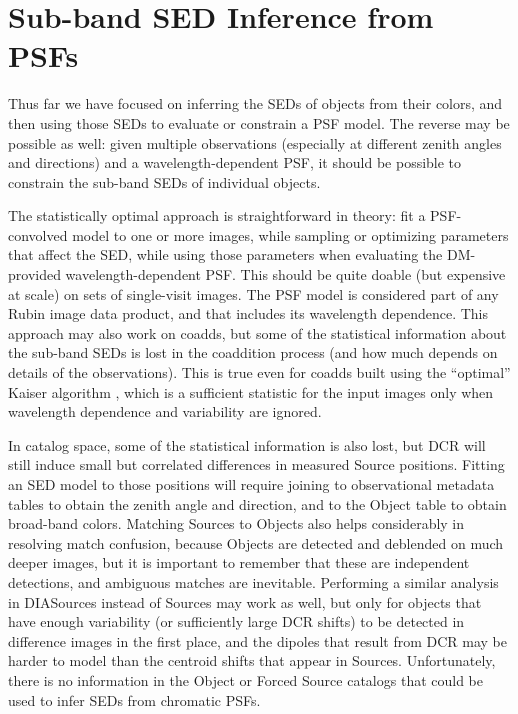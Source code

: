 \documentclass[DM,authoryear,toc]{lsstdoc}
\begin{document}
\section{Sub-band SED Inference from PSFs}

\label{sec:sub-band-sed-inference}

Thus far we have focused on inferring the SEDs of objects from their colors, and then using those SEDs to evaluate or constrain a PSF model.
The reverse may be possible as well: given multiple observations (especially at different zenith angles and directions) and a wavelength-dependent PSF, it should be possible to constrain the sub-band SEDs of individual objects.

The statistically optimal approach is straightforward in theory: fit a PSF-convolved model to one or more images, while sampling or optimizing parameters that affect the SED, while using those parameters when evaluating the DM-provided wavelength-dependent PSF.
This should be quite doable (but expensive at scale) on sets of single-visit images.
The PSF model is considered part of any Rubin image data product, and that includes its wavelength dependence.
This approach may also work on coadds, but some of the statistical information about the sub-band SEDs is lost in the coaddition process (and how much depends on details of the observations).
This is true even for coadds built using the ``optimal'' Kaiser algorithm \citep{dmtn-015,Kaiser04,2017ApJ...836..188Z}, which is a sufficient statistic for the input images only when wavelength dependence and variability are ignored.

In catalog space, some of the statistical information is also lost, but DCR will still induce small but correlated differences in measured Source positions.
Fitting an SED model to those positions will require joining to observational metadata tables to obtain the zenith angle and direction, and to the Object table to obtain broad-band colors.
Matching Sources to Objects also helps considerably in resolving match confusion, because Objects are detected and deblended on much deeper images, but it is important to remember that these are independent detections, and ambiguous matches are inevitable.
Performing a similar analysis in DIASources instead of Sources may work as well, but only for objects that have enough variability (or sufficiently large DCR shifts) to be detected in difference images in the first place, and the dipoles that result from DCR may be harder to model than the centroid shifts that appear in Sources.
Unfortunately, there is no information in the Object or Forced Source catalogs that could be used to infer SEDs from chromatic PSFs.
\end{document}
